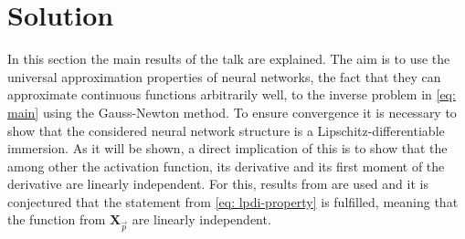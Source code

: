 \section{Solution}
In this section the main results of the talk are explained. The aim is to use
the universal approximation properties of neural networks, the fact that they
can approximate continuous functions arbitrarily well, to the inverse problem
in \ref{eq: main} using the Gauss-Newton method. To ensure convergence it is
necessary to show that the considered neural network structure is a
Lipschitz-differentiable immersion. As it will be shown, a direct implication
of this is to show that the among other the activation function, its
derivative and its first moment of the derivative are linearly independent.
For this, results from \cite{lamperski_2022} are used and it is conjectured
that the statement from \ref{eq: lpdi-property} is fulfilled, meaning that
the function from $\mathbf{X}_{\vec{p}}$ are linearly independent.
